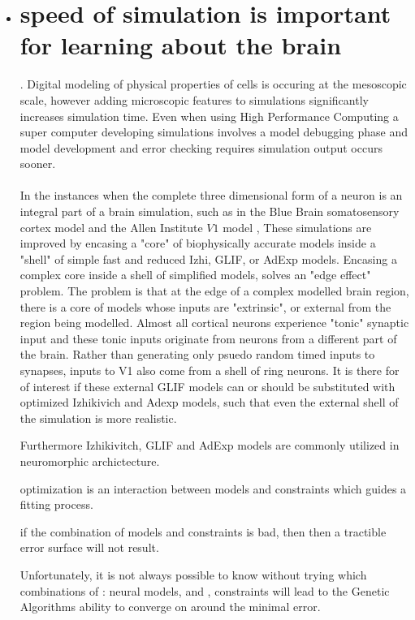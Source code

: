 \documentclass{article}
\begin{document}
\begin{itemize}
\item \section{speed of simulation is important for learning about the brain}. Digital modeling of physical properties of cells is occuring at the mesoscopic scale, however adding microscopic features to simulations significantly increases simulation time. Even when using High Performance Computing a super computer developing simulations involves a model debugging phase and model development and error checking requires simulation output occurs sooner.\\
\\
In the instances when the complete three dimensional form of a neuron is an integral part of a brain simulation, such as in the Blue Brain somatosensory cortex model \cite{} and the Allen Institute $V1$ model \cite{}, These simulations are improved by encasing a "core" of biophysically accurate models inside a "shell" of simple fast and reduced Izhi, GLIF, or AdExp models. 
Encasing a complex core inside a shell of simplified models, solves an "edge effect" problem. The problem is that at the edge of a complex modelled brain region, there is a core of models whose inputs are "extrinsic", or external from the region being modelled. Almost all cortical neurons experience "tonic" synaptic input and these tonic inputs originate from neurons from a different part of the brain. Rather than generating only psuedo random timed inputs to synapses, inputs to V1 also come from a shell of ring neurons. It is there for of interest if these external GLIF models can or should be substituted with optimized Izhikivich and Adexp models, such that even the external shell of the simulation is more realistic.

Furthermore Izhikivitch, GLIF and AdExp models are commonly utilized in neuromorphic archictecture.


\subitem optimization is an interaction between models and constraints which guides a fitting process. 

\subitem if the combination of models and constraints is bad, then then a tractible error surface will not result.  

\subsubitem Unfortunately, it is not always possible to know without trying which combinations of \subitem[A]: neural models, and \subitem[B], constraints will lead to the Genetic Algorithms ability to converge on around the minimal error. 


\end{itemize}
\end{document}
